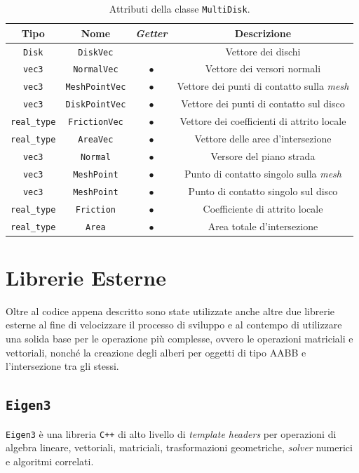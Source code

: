 \begin{table}[h!]
	\centering
	\begin{tabular}{|c|c|c|c|}
		\hline 
		\textbf{Tipo} & \textbf{Nome} & \textit{\textbf{Getter}} & \textbf{Descrizione} \\ \hline 
		\texttt{Disk} & \texttt{DiskVec} &  & Vettore dei dischi \\ \hline 
		\texttt{vec3} & \texttt{NormalVec} & $\bullet$ & Vettore dei versori normali \\ \hline
		\texttt{vec3} & \texttt{MeshPointVec} & $\bullet$ & Vettore dei punti di contatto sulla \textit{mesh} \\ \hline
		\texttt{vec3} & \texttt{DiskPointVec} & $\bullet$ & Vettore dei punti di contatto sul disco \\ \hline
		\texttt{real\_type} & \texttt{FrictionVec} & $\bullet$ & Vettore dei coefficienti di attrito locale \\ \hline
		\texttt{real\_type} & \texttt{AreaVec} & $\bullet$ & Vettore delle aree d'intersezione \\ \hline
		\texttt{vec3} & \texttt{Normal} & $\bullet$ & Versore del piano strada \\ \hline
		\texttt{vec3} & \texttt{MeshPoint} & $\bullet$ & Punto di contatto singolo sulla \textit{mesh} \\ \hline
		\texttt{vec3} & \texttt{MeshPoint} & $\bullet$ & Punto di contatto singolo sul disco \\ \hline
		\texttt{real\_type} & \texttt{Friction} & $\bullet$ & Coefficiente di attrito locale \\ \hline
		\texttt{real\_type} & \texttt{Area} & $\bullet$ & Area totale d'intersezione \\ \hline
	\end{tabular}
	\caption{Attributi della classe \texttt{MultiDisk}.}
	\label{}
\end{table}
%
\section{Librerie Esterne}
Oltre al codice appena descritto sono state utilizzate anche altre due librerie esterne al fine di velocizzare il processo di sviluppo e al contempo di utilizzare una solida base per le operazione più complesse, ovvero le operazioni matriciali e vettoriali, nonché la creazione degli alberi per oggetti di tipo \ac{AABB} e l'intersezione tra gli stessi.
%
\subsection{\texttt{Eigen3}}
\texttt{Eigen3} è una libreria \texttt{C++} di alto livello di \textit{template headers} per operazioni di algebra lineare, vettoriali, matriciali, trasformazioni geometriche, \textit{solver} numerici e algoritmi correlati.

